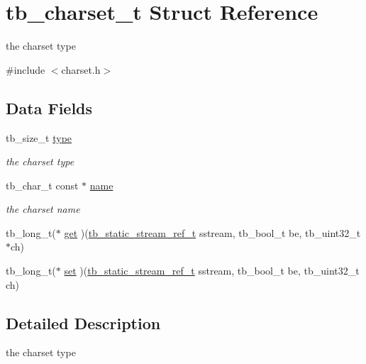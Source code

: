 \hypertarget{structtb__charset__t}{\section{tb\-\_\-charset\-\_\-t Struct Reference}
\label{structtb__charset__t}
}


the charset type  




{\ttfamily \#include $<$charset.\-h$>$}

\subsection*{Data Fields}
\begin{DoxyCompactItemize}
\item 
\hypertarget{structtb__charset__t_a5684d5117461dee93d6e64ac76e27fb4}{tb\-\_\-size\-\_\-t \hyperlink{structtb__charset__t_a5684d5117461dee93d6e64ac76e27fb4}{type}}\label{structtb__charset__t_a5684d5117461dee93d6e64ac76e27fb4}

\begin{DoxyCompactList}\small\item\em the charset type \end{DoxyCompactList}\item 
\hypertarget{structtb__charset__t_a6dc420d5484673419ebbe97d01e08da6}{tb\-\_\-char\-\_\-t const $\ast$ \hyperlink{structtb__charset__t_a6dc420d5484673419ebbe97d01e08da6}{name}}\label{structtb__charset__t_a6dc420d5484673419ebbe97d01e08da6}

\begin{DoxyCompactList}\small\item\em the charset name \end{DoxyCompactList}\item 
tb\-\_\-long\-\_\-t($\ast$ \hyperlink{structtb__charset__t_a992d5d1d054ef4900b293d96c87a09e9}{get} )(\hyperlink{static__stream_8h_a6f19ed215d23e2708f134474b87d281a}{tb\-\_\-static\-\_\-stream\-\_\-ref\-\_\-t} sstream, tb\-\_\-bool\-\_\-t be, tb\-\_\-uint32\-\_\-t $\ast$ch)
\item 
tb\-\_\-long\-\_\-t($\ast$ \hyperlink{structtb__charset__t_a93d799d2d1bb181e7cd8884b8ef7e5b0}{set} )(\hyperlink{static__stream_8h_a6f19ed215d23e2708f134474b87d281a}{tb\-\_\-static\-\_\-stream\-\_\-ref\-\_\-t} sstream, tb\-\_\-bool\-\_\-t be, tb\-\_\-uint32\-\_\-t ch)
\end{DoxyCompactItemize}


\subsection{Detailed Description}
the charset type 

